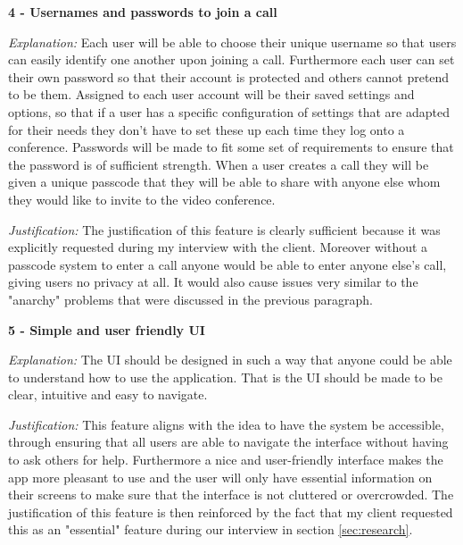 \vspace{0.2cm}

\textsf{\bfseries 4 - Usernames and passwords to join a call} \\ 
\vspace{0.1cm}

\textit{Explanation:} Each user will be able to choose their unique username so 
that users can easily identify one another upon joining a 
call. Furthermore each user can set their own password so 
that their account is protected and others cannot pretend to 
be them. 
Assigned to each user account will be their saved settings and
options, so that if a user has a specific configuration of 
settings that are adapted for their needs they don't have to 
set these up each time they log onto a conference. Passwords 
will be made to fit some set of requirements to ensure that 
the password is of sufficient strength. When a user creates a 
call they will be given a unique passcode that they will be 
able to share with anyone else whom they would like to invite
to the video conference. \vspace{0.1cm}

\textit{Justification:} The justification of this feature is
clearly sufficient because it was explicitly requested during
my interview with the client. Moreover without a passcode 
system to enter a call anyone would be able to enter anyone
else's call, giving users no privacy at all. It would also 
cause issues very similar to the "anarchy" problems that 
were discussed in the previous paragraph.

\vspace{0.2cm}

\textsf{\bfseries 5 - Simple and user friendly UI} \\ \vspace{0.1cm}

\textit{Explanation:} 
The UI should be designed in such a way that anyone could be 
able to understand how to use the application. That is the UI
should be made to be clear, intuitive and easy to navigate.
\vspace{0.1cm}

\textit{Justification:} 
This feature
aligns with the idea to have the system be accessible,
through ensuring that all users are able to navigate the 
interface without having to ask others for help. Furthermore
a nice and user-friendly interface makes the app more 
pleasant to use and the user will only have essential 
information on their screens
to make sure that the interface is not cluttered or 
overcrowded. The justification of this feature is then 
reinforced by the fact that my client requested this as an 
"essential" feature during our interview
in section \ref{sec:research}. \vspace{0.2cm}

